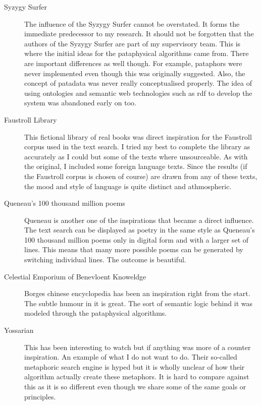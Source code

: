 \begin{description}
  \item[Syzygy Surfer] The influence of the Syzygy Surfer cannot be overstated. It forms the immediate predecessor to my research. It should not be forgotten that the authors of the Syzygy Surfer are part of my supervisory team. This is where the initial ideas for the pataphysical algorithms came from. There are important differences as well though. For example, pataphors were never implemented even though this was originally suggested. Also, the concept of patadata was never really conceptualised properly. The idea of using ontologies and semantic web technologies such as \gls{rdf} to develop the system was abandoned early on too.
  \item[Faustroll Library] This fictional library of real books was direct inspiration for the Faustroll corpus used in the text search. I tried my best to complete the library as accurately as I could but some of the texts where unsourceable. As with the original, I included some foreign language texts. Since the results (if the Faustroll corpus is chosen of course) are drawn from any of these texts, the mood and style of language is quite distinct and athmospheric.
  \item[Queneau's 100 thousand million poems] Queneau is another one of the inspirations that became a direct influence. The text search can be displayed as poetry in the same style as Queneau's 100 thousand million poems only in digital form and with a larger set of lines. This means that many more possible poems can be generated by switching individual lines. The outcome is beautiful.
  \item[Celestial Emporium of Benevloent Knoweldge] Borges chinese encyclopedia has been an inspiration right from the start. The subtle humour in it is great. The sort of semantic logic behind it was modeled through the pataphysical algorithms.
  \item[Yossarian] This has been interesting to watch but if anything was more of a counter inspiration. An example of what I do not want to do. Their so-called metaphoric search engine is hyped but it is wholly unclear of how their algorithm actually create these metaphors. It is hard to compare against this as it is so different even though we share some of the same goals or principles.

\end{description}
